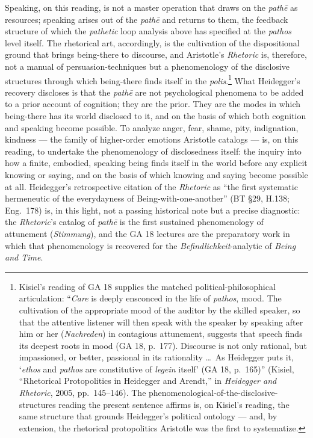 \documentclass{article}
\begin{document}
Speaking, on this reading, is not a master operation that draws on the \textit{pathē} as resources; speaking arises out of the \textit{pathē} and returns to them, the feedback structure of which the \textit{pathetic} loop analysis above has specified at the \textit{pathos} level itself. The rhetorical art, accordingly, is the cultivation of the dispositional ground that brings being-there to discourse, and Aristotle's \textit{Rhetoric} is, therefore, not a manual of persuasion-techniques but a phenomenology of the disclosive structures through which being-there finds itself in the \textit{polis}.\footnote{Kisiel's reading of GA 18 supplies the matched political-philosophical articulation: ``\textit{Care} is deeply ensconced in the life of \textit{pathos}, mood. The cultivation of the appropriate mood of the auditor by the skilled speaker, so that the attentive listener will then speak with the speaker by speaking after him or her (\textit{Nachreden}) in contagious attunement, suggests that speech finds its deepest roots in mood (GA 18, p.~177). Discourse is not only rational, but impassioned, or better, passional in its rationality \ldots\ As Heidegger puts it, `\textit{ethos} and \textit{pathos} are constitutive of \textit{legein} itself' (GA 18, p.~165)'' (Kisiel, ``Rhetorical Protopolitics in Heidegger and Arendt,'' in \textit{Heidegger and Rhetoric}, 2005, pp.~145--146). The phenomenological-of-the-disclosive-structures reading the present sentence affirms is, on Kisiel's reading, the same structure that grounds Heidegger's political ontology --- and, by extension, the rhetorical protopolitics Aristotle was the first to systematize.} What Heidegger's recovery discloses is that the \textit{pathē} are not psychological phenomena to be added to a prior account of cognition; they are the prior. They are the modes in which being-there has its world disclosed to it, and on the basis of which both cognition and speaking become possible. To analyze anger, fear, shame, pity, indignation, kindness --- the family of higher-order emotions Aristotle catalogs --- is, on this reading, to undertake the phenomenology of disclosedness itself: the inquiry into how a finite, embodied, speaking being finds itself in the world before any explicit knowing or saying, and on the basis of which knowing and saying become possible at all. Heidegger's retrospective citation of the \textit{Rhetoric} as ``the first systematic hermeneutic of the everydayness of Being-with-one-another'' (BT \S29, H.138; Eng.~178) is, in this light, not a passing historical note but a precise diagnostic: the \textit{Rhetoric}'s catalog of \textit{pathē} is the first sustained phenomenology of attunement (\textit{Stimmung}), and the GA 18 lectures are the preparatory work in which that phenomenology is recovered for the \textit{Befindlichkeit}-analytic of \textit{Being and Time}.
\end{document}
